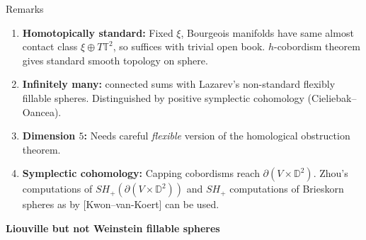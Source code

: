 \documentclass{beamer}
\begin{document}
\begin{frame}{Remarks}

\begin{enumerate}
    \item \textbf{Homotopically standard:} Fixed $\xi$, Bourgeois manifolds have same almost contact class $\xi \oplus T\mathbb T^2$, so suffices with trivial open book. $h$-cobordism theorem gives standard smooth topology on sphere.

\pause

    \item \textbf{Infinitely many:} connected sums with Lazarev's non-standard flexibly fillable spheres. Distinguished by positive symplectic cohomology (Cieliebak--Oancea).

\pause
    
    \item \textbf{Dimension $5$:} Needs careful \emph{flexible} version of the homological obstruction theorem.

    \pause
    
    \item \textbf{Symplectic cohomology:} Capping cobordisms reach $\partial(V\times \mathbb D^2)$. Zhou's computations of $SH_+(\partial(V\times \mathbb D^2))$ and $SH_+$ computations of Brieskorn spheres as by [Kwon--van-Koert] can be used.  
    
\end{enumerate}
    
\end{frame}

\begin{frame}
\begin{tcolorbox}
\Huge \begin{center}
    \textbf{Liouville but not Weinstein fillable spheres}
\end{center}
\end{tcolorbox}
\end{frame}
\end{document}
